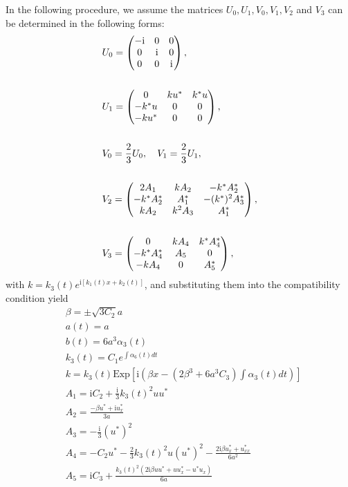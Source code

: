 \documentclass[12pt]{article}
\begin{document}
In the following procedure, we assume the matrices $U_{0}, U_{1}, V_{0}, V_{1}, V_{2}$ and $V_{3}$ can be determined in the following forms:
\begin{align}
  & U_{0} = \begin{pmatrix}
             -\mathrm{i} & 0 & 0 \\
              0 & \mathrm{i} & 0 \\
              0 & 0 & \mathrm{i}
            \end{pmatrix}, \label{4} \\ \notag\\
  & U_{1} = \begin{pmatrix}
              0 & ku^{*} & k^{*}u \\
              -k^{*}u & 0 & 0 \\
              -ku^{*} & 0 & 0
            \end{pmatrix}, \label{5} \\ \notag\\
  & V_{0} = \frac{2}{3}U_{0}, \quad V_{1} = \frac{2}{3}U_{1}, \\ \notag\\
  & V_{2} = \begin{pmatrix}
              2A_{1} & kA_{2} & -k^{*}A_{2}^{*} \\
              -k^{*}A_{2}^{*} & A_{1}^{*} & -(k^{*})^{2}A_{3}^{*} \\
              kA_{2} & k^{2}A_{3} & A_{1}^{*}
            \end{pmatrix}, \\ \notag\\
  & V_{3} = \begin{pmatrix}
              0 & kA_{4} & k^{*}A_{4}^{*} \\
              -k^{*}A_{4}^{*} & A_{5} & 0 \\
              -kA_{4} & 0 & A_{5}^{*}
            \end{pmatrix}, \label{8}
\end{align}
with $k=k_{3}(t)e^{\mathrm{i}[k_{1}(t)x + k_{2}(t)]}$, and substituting them into the compatibility condition yield
\begin{align}
  & \beta = \pm \sqrt{3C_{2}}a \\
  & a(t) = a \\
  & b(t) = 6a^{3}\alpha_{3}(t) \\
  & k_{3}(t) = C_{1}e^{\int \alpha_{6}(t)dt}   \\
  & k = k_{3}(t)\mathrm{Exp}\left[\mathrm{i}\left(\beta x - (2\beta^{3} + 6a^{3}C_{3})\int \alpha_{3}(t)dt \right)\right] \\
  & A_{1} = \mathrm{i}C_{2} + \frac{\mathrm{i}}{3}k_{3}(t)^{2}uu^{*} \\
  & A_{2} = \frac{-\beta u^{*} + \mathrm{i}u^{*}_{x}}{3a}   \\
  & A_{3} = -\frac{\mathrm{i}}{3}(u^{*})^{2}  \\
  & A_{4} = -C_{2}u^{*} - \frac{2}{3}k_{3}(t)^{2}u(u^{*})^{2} - \frac{2\mathrm{i}\beta u^{*}_{x} + u^{*}_{xx}}{6a^{2}} \\
  & A_{5} = \mathrm{i}C_{3} + \frac{k_{3}(t)^{2}(2\mathrm{i}\beta uu^{*} + uu^{*}_{x} - u^{*}u_{x})}{6a}
\end{align}
\end{document}
